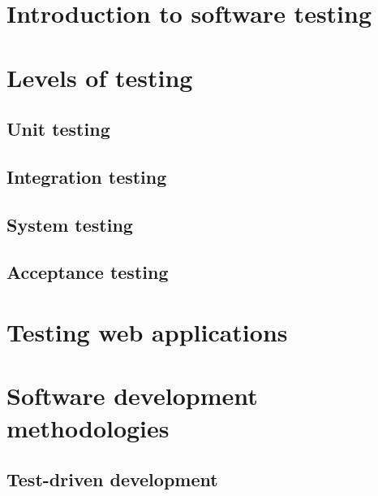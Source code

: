 \documentclass[a4paper]{report}
\begin{document}
  \section{Introduction to software testing}
    

  \section{Levels of testing}
    

    \subsection{Unit testing}
    \label{sec:unit_testing}
    

    \subsection{Integration testing}
    \label{sec:integration_testing}
    

    \subsection{System testing}
    

    \subsection{Acceptance testing}
    


  \section{Testing web applications}
    


  \section{Software development methodologies}
    

    \subsection{Test-driven development}
    \label{sec:tdd}
    
\end{document}

